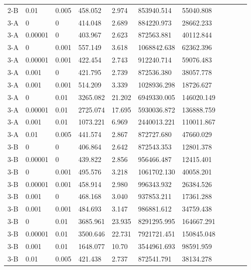 \documentclass{tamuccthesis}
\begin{document}
\begin{appendices}
\begin{small}
\begin{longtable}{lllllllllll}
    2-B &  0.01 & 0.005 &  458.052 &  2.974 &  853940.514 &  55040.808 \\
    3-A &       0 &     0 & 414.048 & 2.689 &  884220.973 & 28662.233 \\
    3-A & 0.00001 &     0 & 403.967 & 2.623 &  872563.881 & 40112.844 \\
    3-A &       0 & 0.001 & 557.149 & 3.618 & 1068842.638 & 62362.396 \\
    3-A & 0.00001 & 0.001 & 422.454 & 2.743 &  912240.714 & 59076.483 \\
    3-A & 0.001   &     0 &  421.795 &  2.739 &  872536.380 &  38057.778 \\
    3-A & 0.001   & 0.001 &  514.209 &  3.339 & 1028936.298 &  18726.627 \\
    3-A &     0   &  0.01 & 3265.082 & 21.202 & 6949330.005 & 146020.149 \\
    3-A & 0.00001 &  0.01 & 2725.074 & 17.695 & 5930036.872 & 136888.759 \\
    3-A & 0.001 &  0.01 & 1073.221 & 6.969 & 2440013.221 & 110011.867 \\
    3-A &  0.01 & 0.005 &  441.574 & 2.867 &  872727.680 &  47660.029 \\
    3-B &       0 &     0 & 406.864 & 2.642 &  872543.353 & 12801.378 \\
    3-B & 0.00001 &     0 & 439.822 & 2.856 &  956466.487 & 12415.401 \\
    3-B &       0 & 0.001 & 495.576 & 3.218 & 1061702.130 & 40058.201 \\
    3-B & 0.00001 & 0.001 & 458.914 & 2.980 &  996343.932 & 26384.526 \\
    3-B & 0.001   &     0 &  468.168 &  3.040 &  937853.211 &  17361.288 \\
    3-B & 0.001   & 0.001 &  484.693 &  3.147 &  986881.612 &  34759.438 \\
    3-B &     0   &  0.01 & 3685.961 & 23.935 & 8291295.995 & 164667.291 \\
    3-B & 0.00001 &  0.01 & 3500.646 & 22.731 & 7921721.451 & 150845.048 \\
    3-B & 0.001 &  0.01 & 1648.077 & 10.70 & 3544961.693 & 98591.959 \\
    3-B &  0.01 & 0.005 &  421.438 &  2.737 & 872541.791 & 38134.278 \\      
\end{longtable}
\end{small}



\end{appendices}
\end{document}
